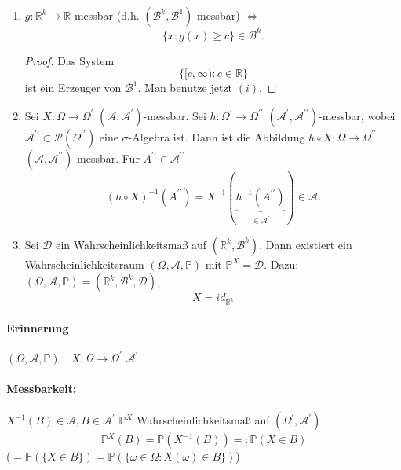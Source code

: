 \documentclass[a4paper,11pt,notitlepage]{report}
\newcommand{\R}{{\ensuremath{\mathbb{R}}}}
\newcommand{\Prim}{{\ensuremath{\mathbb{P}}}}
\begin{document}
\begin{enumerate}
	\item $g \colon \R^k \rightarrow \R$ messbar (d.h. $(\mathcal{B}^k, \mathcal{B}^1)$-messbar) $\Leftrightarrow$
	$$\{x \colon g(x) \geq c \} \in \mathcal{B}^k.$$
	\begin{proof}
		Das System
		$$\{[c, \infty) \colon c \in \R\}$$
		ist ein Erzeuger von $\mathcal{B}^1$.
		\newline
		Man benutze jetzt $(i)$.
	\end{proof}
	\item Sei $X \colon \Omega \rightarrow \Omega^\prime$ $(\mathcal{A}, \mathcal{A}^\prime)$-messbar. \newline
	Sei $h \colon \Omega^\prime \rightarrow \Omega^{\prime\prime}$ $(\mathcal{A}^\prime, \mathcal{A}^{\prime\prime})$-messbar, wobei $\mathcal{A}^{\prime\prime} \subset \mathcal{P}(\Omega^{\prime\prime})$ eine $\sigma$-Algebra ist.
	\newline
	Dann ist die Abbildung $h \circ X \colon \Omega \rightarrow \Omega^{\prime\prime}$ $(\mathcal{A}, \mathcal{A}^{\prime\prime})$-messbar. Für $A^{\prime\prime} \in \mathcal{A}^{\prime\prime}$
	$$(h \circ X)^{-1}(A^{\prime\prime}) = X^{-1}(\underbrace{h^{-1}(A^{\prime\prime})}_{\in \mathcal{A}^\prime}) \in \mathcal{A}.$$
	\item Sei $\mathcal{D}$ ein Wahrscheinlichkeitsmaß auf $(\R^k, \mathcal{B}^k)$. Dann existiert ein Wahrscheinlichkeitsraum $(\Omega, \mathcal{A}, \Prim)$ mit $\Prim^X = \mathcal{D}$.
	\newline
	Dazu: $(\Omega, \mathcal{A}, \Prim) = (\R^k, \mathcal{B}^k, \mathcal{D})$,
	$$X = id_{\R^k}$$ 
\end{enumerate}

\paragraph{Erinnerung}
$(\Omega, \mathcal{A}, \Prim) \quad X \colon \Omega \rightarrow \Omega^\prime$
$\mathcal{A}^\prime$

\paragraph{Messbarkeit:}
$X^{-1}(B) \in \mathcal{A}, B \in \mathcal{A}^\prime$ \newline
$\Prim^X$ Wahrscheinlichkeitsmaß auf $(\Omega^\prime, \mathcal{A}^\prime)$
$$\Prim^X(B) = \Prim(X^{-1}(B)) =: \Prim(X \in B)$$ ($= \Prim(\{X \in B\}) = \Prim(\{ \omega \in \Omega \colon X(\omega) \in B\})$) \newline
\end{document}
